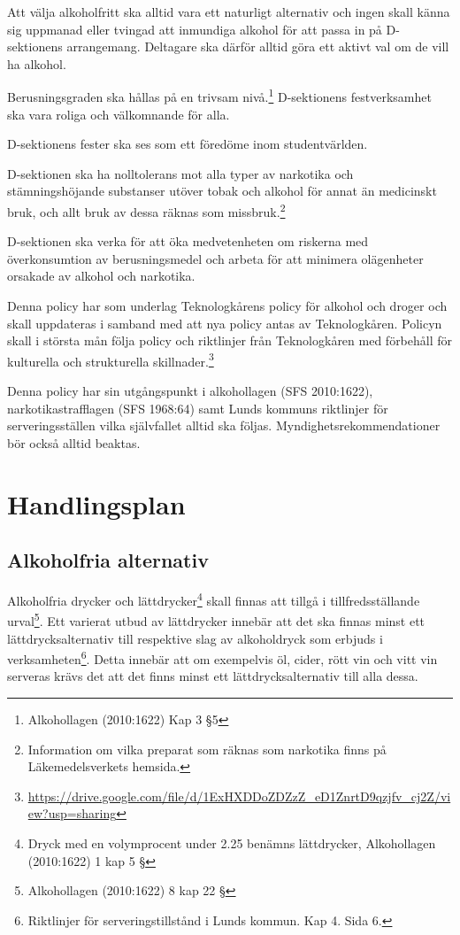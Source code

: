 \documentclass[]{dsekprotokoll}
\begin{document}
Att välja alkoholfritt ska alltid vara ett naturligt alternativ och ingen skall känna sig uppmanad eller tvingad att inmundiga alkohol för att passa in på D-sektionens arrangemang. Deltagare ska därför alltid göra ett aktivt val om de vill ha alkohol.

Berusningsgraden ska hållas på en trivsam nivå.\footnote{Alkohollagen (2010:1622) Kap 3 §5} D-sektionens festverksamhet ska vara
roliga och välkomnande för alla.

D-sektionens fester ska ses som ett föredöme inom studentvärlden.

D-sektionen ska ha nolltolerans mot alla typer av narkotika och stämningshöjande substanser utöver tobak och alkohol för annat än medicinskt bruk, och allt bruk av dessa räknas som missbruk.\footnote{Information om vilka preparat som räknas som narkotika finns på Läkemedelsverkets hemsida.}

D-sektionen ska verka för att öka medvetenheten om riskerna med överkonsumtion av
berusningsmedel och arbeta för att minimera olägenheter orsakade av alkohol och narkotika.

Denna policy har som underlag Teknologkårens policy för alkohol och droger och skall uppdateras i samband med att nya policy antas av Teknologkåren. Policyn skall i största mån följa policy och riktlinjer från Teknologkåren med förbehåll för kulturella och strukturella skillnader.\footnote{\url{https://drive.google.com/file/d/1ExHXDDoZDZzZ_eD1ZnrtD9qzjfv_cj2Z/view?usp=sharing}}

Denna policy har sin utgångspunkt i alkohollagen (SFS 2010:1622), narkotikastrafflagen
(SFS 1968:64) samt Lunds kommuns riktlinjer för serveringsställen vilka självfallet alltid ska
följas. Myndighetsrekommendationer bör också alltid beaktas.

\section{Handlingsplan}
\subsection{Alkoholfria alternativ}
Alkoholfria drycker och lättdrycker\footnote{Dryck med en volymprocent under 2.25 benämns lättdrycker, Alkohollagen (2010:1622) 1 kap 5 §} skall finnas att tillgå i tillfredsställande urval\footnote{Alkohollagen (2010:1622) 8 kap 22 §}. Ett varierat utbud av lättdrycker innebär att det ska finnas minst ett lättdrycksalternativ till respektive slag av alkoholdryck som erbjuds i verksamheten\footnote{Riktlinjer för serveringstillstånd i Lunds kommun. Kap 4. Sida 6.}. Detta innebär att om exempelvis öl, cider, rött
vin och vitt vin serveras krävs det att det finns minst ett lättdrycksalternativ till alla dessa.
\end{document}
